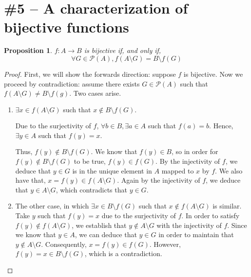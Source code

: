 \documentclass[11pt,letterpaper]{article}
\newtheorem{prop}{Proposition}
\begin{document}
\section*{\#5 -- A characterization of bijective functions}

\begin{prop}
    $f : A \to B$ is bijective if, and only if,
    \begin{equation*}
        \forall G \in \mathcal{P}(A), f(A \setminus G) = B \setminus f(G)
    \end{equation*}
\end{prop}

\begin{proof}
    First, we will show the forwards direction: suppose $f$ is bijective. Now
    we proceed by contradiction: assume there exists $G \in \mathcal{P}(A)$
    such that $f(A \setminus G) \neq B \setminus f(g)$. Two cases arise.

    \begin{enumerate}
        \item $\exists x \in f(A \setminus G)$ such that
            $x \notin B \setminus f(G)$.

            Due to the surjectivity of $f$,
            $\forall b \in B, \exists a \in A$ such that $f(a) = b$.
            Hence, $\exists y \in A$ such that $f(y) = x$.

            Thus, $f(y) \notin B \setminus f(G)$. We know that $f(y) \in B$, so
            in order for $f(y) \notin B \setminus f(G)$ to be true,
            $f(y) \in f(G)$. By the injectivity of $f$, we deduce that $y \in
            G$ is in the unique element in $A$ mapped to $x$ by $f$.  We also
            have that, $x = f(y) \in f(A \setminus G)$. Again by the
            injectivity of $f$, we deduce that $y \in A \setminus G$, which
            contradicts that $y \in G$.

        \item The other case, in which $\exists x \in B \setminus f(G)$
            such that $x \notin f(A \setminus G)$ is similar. Take $y$ such
            that $f(y) = x$ due to the surjectivity of $f$. In order to satisfy
            $f(y) \notin f(A \setminus G)$, we establish that
            $y \notin A \setminus G$ with the injectivity of $f$. Since we know
            that $y \in A$, we can deduce that $y \in G$ in order to maintain
            that $y \notin A \setminus G$. Consequently, $x = f(y) \in f(G)$.
            However, $f(y) = x \in B \setminus f(G)$, which is a contradiction.
    \end{enumerate}


\end{proof}
\end{document}
